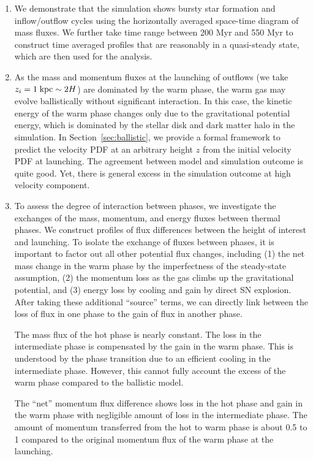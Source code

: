 \documentclass[twocolumn]{aastex62}
\newcommand\kpc{\;{\rm kpc}}
\begin{document}
\begin{enumerate}
    \item We demonstrate that the simulation shows bursty star formation and inflow/outflow cycles using the horizontally averaged space-time diagram of mass fluxes. We further take time range between 200 Myr and 550 Myr to construct time averaged profiles that are reasonably in a quasi-steady state, which are then used for the analysis.
    
    \item As the mass and momentum fluxes at the launching of outflows (we take $z_i=1\kpc\sim2H$) are dominated by the warm phase, the warm gas may evolve ballistically without significant interaction. In this case, the kinetic energy of the warm phase changes only due to the gravitational potential energy, which is dominated by the stellar disk and dark matter halo in the simulation. In Section~\ref{sec:ballistic}, we provide a formal framework to predict the velocity PDF at an arbitrary height $z$ from the initial velocity PDF at launching. The agreement between model and simulation outcome is quite good. Yet, there is general excess in the simulation outcome at high velocity component.
    
    \item To assess the degree of interaction between phases, we investigate the exchanges of the mass, momentum, and energy fluxes between thermal phases. We construct profiles of flux differences between the height of interest and launching. To isolate the exchange of fluxes between phases, it is important to factor out all other potential flux changes, including (1) the net mass change in the warm phase by the imperfectness of the steady-state assumption, (2) the momentum loss as the gas climbs up the gravitational potential, and (3) energy loss by cooling and gain by direct SN explosion. After taking these additional ``source'' terms, we can directly link between the loss of flux in one phase to the gain of flux in another phase.
    
    The mass flux of the hot phase is nearly constant. The loss in the intermediate phase is compensated by the gain in the warm phase. This is understood by the phase transition due to an efficient cooling in the intermediate phase. However, this cannot fully account the excess of the warm phase compared to the ballistic model.
    
    The ``net'' momentum flux difference shows loss in the hot phase and gain in the warm phase with negligible amount of loss in the intermediate phase. The amount of momentum transferred from the hot to warm phase is about 0.5 to 1 compared to the original momentum flux of the warm phase at the launching. 
    

\end{enumerate}
\end{document}
